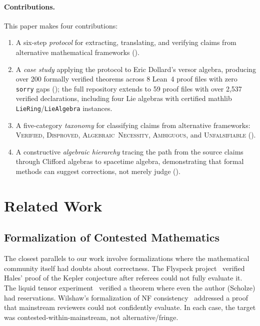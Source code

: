 \documentclass[runningheads]{llncs}
\begin{document}
\paragraph{Contributions.} This paper makes four contributions:
\begin{enumerate}
\item A six-step \emph{protocol} for extracting, translating, and verifying
  claims from alternative mathematical frameworks ().
\item A \emph{case study} applying the protocol to Eric Dollard's versor
  algebra, producing over 200 formally verified theorems across 8 Lean~4 proof files
  with zero \texttt{sorry} gaps (); the full repository
  extends to 59 proof files with over 2,537 verified declarations, including
  four Lie algebras with certified mathlib \texttt{LieRing}/\texttt{LieAlgebra}
  instances.
\item A five-category \emph{taxonomy} for classifying claims from alternative
  frameworks: \textsc{Verified}, \textsc{Disproved},
  \textsc{Algebraic~Necessity}, \textsc{Ambiguous}, and \textsc{Unfalsifiable}
  ().
\item A constructive \emph{algebraic hierarchy} tracing the path from the
  source claims through Clifford algebras to spacetime algebra, demonstrating
  that formal methods can suggest corrections, not merely judge
  ().
\end{enumerate}

\section{Related Work}
\label{sec:related}

\subsection{Formalization of Contested Mathematics}

The closest parallels to our work involve formalizations where the mathematical
community itself had doubts about correctness. The Flyspeck
project~\cite{hales2017formal} verified Hales' proof of the Kepler conjecture
after referees could not fully evaluate it. The liquid tensor
experiment~\cite{commelin2022liquid} verified a theorem where even the author
(Scholze) had reservations. Wilshaw's formalization of NF
consistency~\cite{wilshaw2024nf} addressed a proof that mainstream reviewers
could not confidently evaluate. In each case, the target was
contested-within-mainstream, not alternative/fringe.
\end{document}
